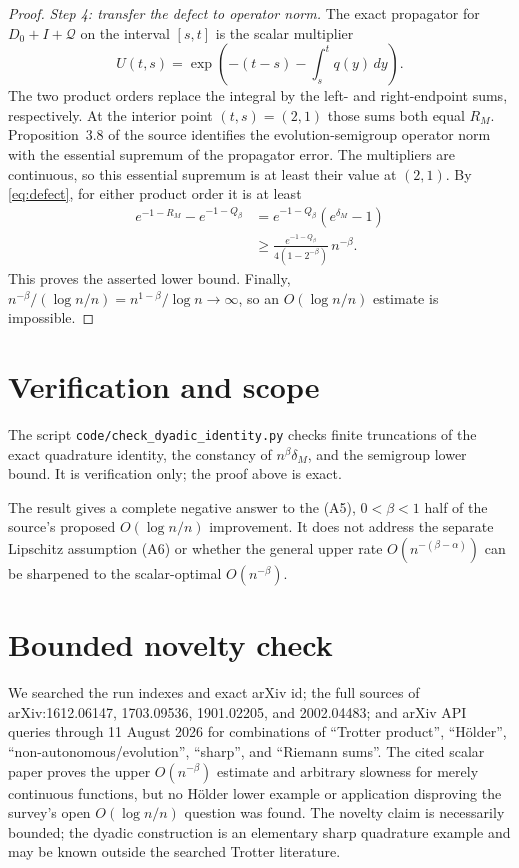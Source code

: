 \documentclass[11pt]{article}
\newcommand{\Q}{\mathcal Q}
\begin{document}
\begin{proof}
\emph{Step 4: transfer the defect to operator norm.}
The exact propagator for $D_0+I+\Q$ on the interval $[s,t]$ is the scalar
multiplier
\[
 U(t,s)=\exp\left(-(t-s)-\int_s^tq(y)\,dy\right).
\]
The two product orders replace the integral by the left- and right-endpoint
sums, respectively.  At the interior point $(t,s)=(2,1)$ those sums both
equal $R_M$.  Proposition~3.8 of the source identifies the evolution-semigroup
operator norm with the essential supremum of the propagator error.  The
multipliers are continuous, so this essential supremum is at least their
value at $(2,1)$.  By \eqref{eq:defect}, for either product order it is at
least
\begin{align*}
 e^{-1-R_M}-e^{-1-Q_\beta}
 &=e^{-1-Q_\beta}(e^{\delta_M}-1)\\
 &\ge \frac{e^{-1-Q_\beta}}{4(1-2^{-\beta})}\,n^{-\beta}.
\end{align*}
This proves the asserted lower bound.  Finally,
$n^{-\beta}/(\log n/n)=n^{1-\beta}/\log n\to\infty$, so an
$O(\log n/n)$ estimate is impossible.
\end{proof}

\section{Verification and scope}

The script \texttt{code/check\_dyadic\_identity.py} checks finite truncations
of the exact quadrature identity, the constancy of $n^\beta\delta_M$, and the
semigroup lower bound.  It is verification only; the proof above is exact.

The result gives a complete negative answer to the (A5), $0<\beta<1$ half of
the source's proposed $O(\log n/n)$ improvement.  It does not address the
separate Lipschitz assumption (A6) or whether the general upper rate
$O(n^{-(\beta-\alpha)})$ can be sharpened to the scalar-optimal
$O(n^{-\beta})$.

\section{Bounded novelty check}

We searched the run indexes and exact arXiv id; the full sources of
arXiv:1612.06147, 1703.09536, 1901.02205, and 2002.04483; and arXiv API
queries through 11 August 2026 for combinations of ``Trotter product'',
``H\"older'', ``non-autonomous/evolution'', ``sharp'', and ``Riemann sums''.
The cited scalar paper proves the upper $O(n^{-\beta})$ estimate and arbitrary
slowness for merely continuous functions, but no H\"older lower example or
application disproving the survey's open $O(\log n/n)$ question was found.
The novelty claim is necessarily bounded; the dyadic construction is an
elementary sharp quadrature example and may be known outside the searched
Trotter literature.
\end{document}
